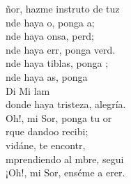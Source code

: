 \begin{cancion}%
	ñor, hazme instruto de tuz\\
	nde haya o, ponga a;\\
	nde haya onsa, perd;\\
	nde haya err, ponga verd.\\
\jump
	nde haya tiblas, ponga ;\\
	nde haya as, ponga   \\
Di             Mi        lam\\
donde haya tristeza, alegría.\\
	Oh!, mi Sor, ponga tu or\\
\jump
	rque dandoo recibi; \\
	vidáne, te encontr, \\
	mprendiendo al mbre, segui \\
	¡Oh!, mi Sor, enséme a erer. \\
\end{cancion}%

